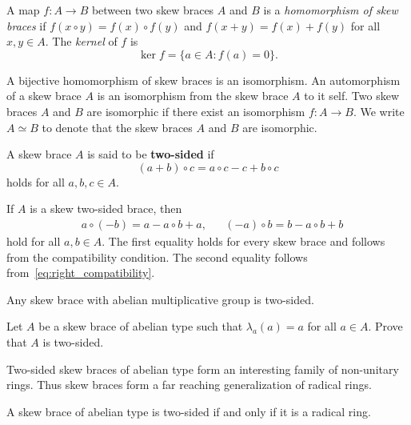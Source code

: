  \begin{definition}
 	A map $f\colon A\to B$ between two skew braces $A$ and $B$ is a {\em homomorphism of skew braces} 
 	if $f(x\circ y)=f(x)\circ f(y)$ and $f(x+y)=f(x)+f(y)$ for all $x,y\in A$.  The \emph{kernel} of $f$ is
     \[
         \ker f=\{a\in A:f(a)=0\}.
     \]
 \end{definition}

A bijective homomorphism of skew braces is an isomorphism. An automorphism of a skew brace $A$ is an isomorphism from the skew brace $A$ to it self. Two skew braces $A$ and $B$ are isomorphic if there exist an isomorphism $f\colon A\rightarrow B$. We write $A\simeq B$ to denote that the skew braces $A$ and $B$ are isomorphic.

\begin{definition}
	A skew brace $A$ is said to be \textbf{two-sided} if 
	\begin{equation}
	\label{eq:right_compatibility}
	(a+b)\circ c=a\circ c-c+b\circ c
	\end{equation}
	holds for all $a,b,c\in A$. 
\end{definition}

If $A$ is a skew two-sided brace, then 
\begin{align}
\label{eq:2sided}
&a\circ(-b)=a-a\circ b+a,
&&(-a)\circ b=b-a\circ b+b    
\end{align}
hold for all $a,b\in A$. The first equality holds for every skew brace and follows 
from the compatibility condition. 
The second equality follows from~\eqref{eq:right_compatibility}. 

\begin{example}
  Any skew brace with abelian multiplicative group is 
  two-sided.
\end{example}

\begin{exercise}
\label{xca:2sided}
	Let $A$ be a skew brace of abelian type such that $\lambda_a(a)=a$ for all $a\in A$.
	Prove that $A$ is two-sided.
\end{exercise}

Two-sided skew braces of abelian type form an interesting family of non-unitary rings.
Thus skew braces form a far reaching generalization of radical rings. 

\begin{theorem}[Rump]
\label{thm:radical}
    A skew brace of abelian type is two-sided if and only if it is a radical ring. 
\end{theorem}

